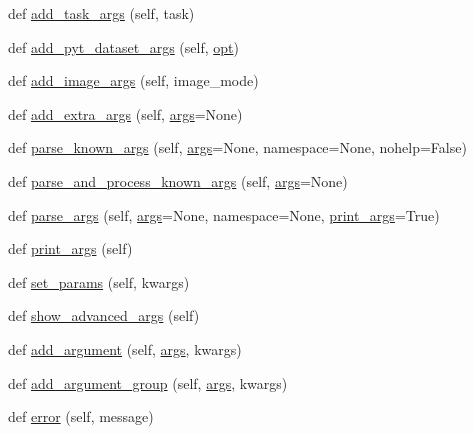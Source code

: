 \begin{DoxyCompactItemize}
\item 
def \hyperlink{classparlai_1_1core_1_1params_1_1ParlaiParser_a61ff766a70bd11365cbcbf71431ce527}{add\+\_\+task\+\_\+args} (self, task)
\item 
def \hyperlink{classparlai_1_1core_1_1params_1_1ParlaiParser_a7d85a5e2fac2c1e8f0f75a4255850b9b}{add\+\_\+pyt\+\_\+dataset\+\_\+args} (self, \hyperlink{classparlai_1_1core_1_1params_1_1ParlaiParser_aa7c461e146b468d033fea1d1dcd92bcf}{opt})
\item 
def \hyperlink{classparlai_1_1core_1_1params_1_1ParlaiParser_a33d186a0cd665df88726b96f1bc3d88e}{add\+\_\+image\+\_\+args} (self, image\+\_\+mode)
\item 
def \hyperlink{classparlai_1_1core_1_1params_1_1ParlaiParser_ade9c068595c2b1110d019f3dedeb79ba}{add\+\_\+extra\+\_\+args} (self, \hyperlink{classparlai_1_1core_1_1params_1_1ParlaiParser_a27d35bfa073588bf887cbdbf45c19f39}{args}=None)
\item 
def \hyperlink{classparlai_1_1core_1_1params_1_1ParlaiParser_a2a98c07f7393108ad67773951038f191}{parse\+\_\+known\+\_\+args} (self, \hyperlink{classparlai_1_1core_1_1params_1_1ParlaiParser_a27d35bfa073588bf887cbdbf45c19f39}{args}=None, namespace=None, nohelp=False)
\item 
def \hyperlink{classparlai_1_1core_1_1params_1_1ParlaiParser_a0409771a420d08fb51a792a089806c70}{parse\+\_\+and\+\_\+process\+\_\+known\+\_\+args} (self, \hyperlink{classparlai_1_1core_1_1params_1_1ParlaiParser_a27d35bfa073588bf887cbdbf45c19f39}{args}=None)
\item 
def \hyperlink{classparlai_1_1core_1_1params_1_1ParlaiParser_ad549d75e2808d63fbc5c5d0e30682f18}{parse\+\_\+args} (self, \hyperlink{classparlai_1_1core_1_1params_1_1ParlaiParser_a27d35bfa073588bf887cbdbf45c19f39}{args}=None, namespace=None, \hyperlink{classparlai_1_1core_1_1params_1_1ParlaiParser_adb1dec3d3433b40209bb2c24722df335}{print\+\_\+args}=True)
\item 
def \hyperlink{classparlai_1_1core_1_1params_1_1ParlaiParser_adb1dec3d3433b40209bb2c24722df335}{print\+\_\+args} (self)
\item 
def \hyperlink{classparlai_1_1core_1_1params_1_1ParlaiParser_a6f1dc42e86af57a7fc4ef9a4c68ca247}{set\+\_\+params} (self, kwargs)
\item 
def \hyperlink{classparlai_1_1core_1_1params_1_1ParlaiParser_a3a75bdeee002ed5a50706f1a6c9797c8}{show\+\_\+advanced\+\_\+args} (self)
\item 
def \hyperlink{classparlai_1_1core_1_1params_1_1ParlaiParser_a3ecf246ac5ed40769d313a2db962b43e}{add\+\_\+argument} (self, \hyperlink{classparlai_1_1core_1_1params_1_1ParlaiParser_a27d35bfa073588bf887cbdbf45c19f39}{args}, kwargs)
\item 
def \hyperlink{classparlai_1_1core_1_1params_1_1ParlaiParser_a2855a5676bf638bfc9491577e603eee3}{add\+\_\+argument\+\_\+group} (self, \hyperlink{classparlai_1_1core_1_1params_1_1ParlaiParser_a27d35bfa073588bf887cbdbf45c19f39}{args}, kwargs)
\item 
def \hyperlink{classparlai_1_1core_1_1params_1_1ParlaiParser_a8d0cb15ecc35f82c94b5a19c2a6a9d12}{error} (self, message)
\end{DoxyCompactItemize}
